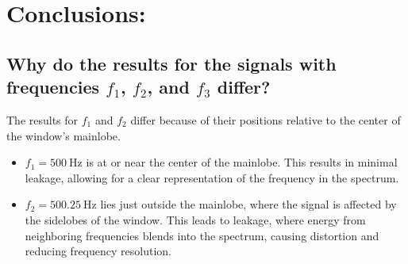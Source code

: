 \documentclass[12pt]{article}
\begin{document}
\FloatBarrier
\vfill

\section*{Conclusions:}
\subsection*{Why do the results for the signals with frequencies \(f_1\), \(f_2\), and \(f_3\) differ?}
The results for \(f_1\) and \(f_2\) differ because of their positions relative to the center of the window's mainlobe.

\begin{itemize}
    \item \(f_1 = 500 \ \text{Hz}\) is at or near the center of the mainlobe. This results in minimal leakage, allowing for a clear representation of the frequency in the spectrum.
    \item \(f_2 = 500.25 \ \text{Hz}\) lies just outside the mainlobe, where the signal is affected by the sidelobes of the window. This leads to leakage, where energy from neighboring frequencies blends into the spectrum, causing distortion and reducing frequency resolution.
\end{itemize}
\end{document}
